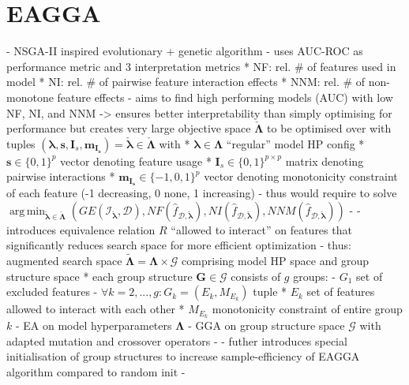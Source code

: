 \documentclass[twoside,11pt]{article}
\DeclareMathOperator*{\argmin}{arg\,min}
\begin{document}
\section{EAGGA}
- NSGA-II inspired evolutionary + genetic algorithm
- uses AUC-ROC as performance metric and 3 interpretation metrics
  * NF: rel. \# of features used in model
  * NI: rel. \# of pairwise feature interaction effects
  * NNM: rel. \# of non-monotone feature effects
- aims to find high performing models (AUC) with low NF, NI, and NNM -> ensures better interpretability than simply optimising for performance
  but creates very large objective space $\check{\boldsymbol\Lambda}$ to be optimised over with
  tuples $(\boldsymbol\lambda, \boldsymbol{s}, \boldsymbol{I}_s, \boldsymbol{m}_{\boldsymbol{I}_{\boldsymbol{s}}})=\check{\boldsymbol\lambda}\in\check{\boldsymbol\Lambda}$
  with
  * $\boldsymbol\lambda\in\boldsymbol\Lambda$ ``regular'' model HP config
  * $\boldsymbol{s}\in\{0,1\}^p$ vector denoting feature usage
  * $\boldsymbol{I}_s\in\{0,1\}^{p\times p}$ matrix denoting pairwise interactions
  * $\boldsymbol{m}_{\boldsymbol{I}_{\boldsymbol{s}}}\in\{-1,0,1\}^p$ vector denoting monotonicity constraint of each feature (-1 decreasing, 0 none, 1 increasing)
- thus would require to solve $\argmin_{\check{\boldsymbol\lambda}\in\check{\boldsymbol\Lambda}} (GE(\mathcal{I}_{\check{\boldsymbol\lambda}},\mathcal{D}),NF(\hat{f}_{\mathcal{D},\check{\boldsymbol\lambda}}),NI(\hat{f}_{\mathcal{D},\check{\boldsymbol\lambda}}),NNM(\hat{f}_{\mathcal{D},\check{\boldsymbol\lambda}}))$
- \citep[pp. 540f]{EAGGA}
- introduces equivalence relation $R$ ``allowed to interact'' on features that significantly reduces search space for more efficient optimization
- thus: augmented search space $\tilde{\boldsymbol\Lambda}=\boldsymbol\Lambda\times\mathcal{G}$ comprising model HP space and group structure space
  * each group structure $\boldsymbol{G}\in\mathcal{G}$ consists of $g$ groups:
    - $G_1$ set of excluded features
    - $\forall k=2,...,g:G_k=(E_k,M_{E_k})$ tuple
      * $E_k$ set of features allowed to interact with each other
      * $M_{E_k}$ monotonicity constraint of entire group $k$
- EA on model hyperparameters $\boldsymbol\Lambda$
- GGA on group structure space $\mathcal{G}$ with adapted mutation and crossover operators
- \citep[pp. 541f]{EAGGA}
- futher introduces special initialisation of group structures to increase sample-efficiency of EAGGA algorithm compared to random init
- \citep[pp. 542f]{EAGGA}
\end{document}
